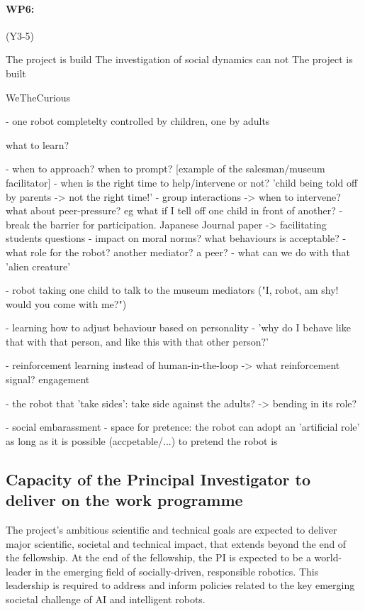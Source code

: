 \documentclass[11pt]{report}
\begin{document}
\paragraph{WP6: \textbf{\wpSix}} (Y3-5)

The project is build 
The investigation of social dynamics can not
The project is built 


WeTheCurious

- one robot completelty controlled by children, one by adults

what to learn?

- when to approach? when to prompt? [example of the salesman/museum facilitator]
- when is the right time to help/intervene or not? 'child being told off by
parents -> not the right time!'
- group interactions -> when to intervene? what about peer-pressure? eg what if
I tell off one child in front of another?
- break the barrier for participation. Japanese Journal paper -> facilitating students questions
- impact on moral norms? what behaviours is acceptable?
- what role for the robot? another mediator? a peer?
- what can we do with that 'alien creature'

- robot taking one child to talk to the museum mediators ("I, robot, am  shy!
would you come with me?")

- learning how to adjust behaviour based on personality
- 'why do I behave like that with that person, and like this with that other
person?'

- reinforcement learning instead of human-in-the-loop -> what reinforcement
signal? engagement

- the robot that 'take sides': take side against the adults? -> bending in its
role?


- social embarassment
- space for pretence: the robot can adopt an 'artificial role' as long as it is
possible (accpetable/...) to pretend the robot is




\subsection{Capacity of the Principal Investigator to deliver on the work programme}

The project's ambitious scientific and technical goals are expected to deliver
major scientific, societal and technical impact, that extends beyond the
end of the fellowship. At the end of the fellowship, the PI is expected to be a
world-leader in the emerging field of socially-driven, responsible robotics.
This leadership is required to address and inform policies related to the key
emerging societal challenge of AI and intelligent robots.
\end{document}
